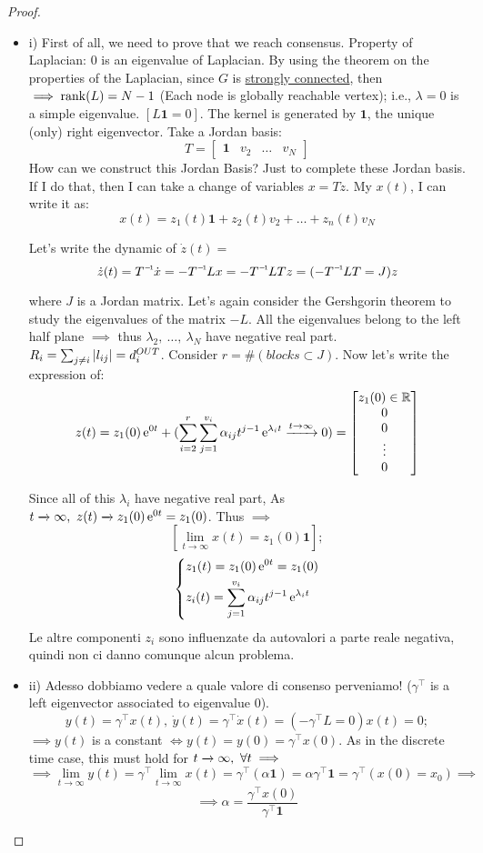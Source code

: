 \begin{proof}
\begin{itemize}
\item{i)}
First of all, we need to prove that we reach consensus. Property of Laplacian: $0$ is an eigenvalue of Laplacian. By using the theorem on the properties of the Laplacian, since $G$ is \underline{strongly connected}, then $\implies \operatorname{rank}(L) = N-1$ (Each node is globally reachable vertex); i.e., $\lambda=0$ is a simple eigenvalue. $[L\mathbf{1}=0]$. The kernel is generated by $\mathbf{1}$, the unique (only) right eigenvector. Take a Jordan basis:
\[
	T = \begin{bmatrix}\mathbf{1}&v_2& \dots & v_N\end{bmatrix}
\]
How can we construct this Jordan Basis? Just to complete these Jordan basis. If I do that, then I can take a change of variables $x=Tz$. My $x(t)$, I can write it as:
\[
	x(t) = z_1(t)\mathbf{1} + z_2(t)v_2 + \dots + z_n(t)v_N
\]

Let's write the dynamic of $\dot{z}(t) = $
\[
	\dot{z}(t) = \inv{T}\dot{x} = -\inv{T}Lx  = -\inv{T}LTz = (-\inv{T}LT=J)z
\]

where $J$ is a Jordan matrix. Let's again consider the Gershgorin theorem to study the eigenvalues of the matrix $-L$. All the eigenvalues belong to the left half plane $\implies$ thus $\lambda_2,\ \dots,\ \lambda_N$ have negative real part. $R_i = \sum_{j\neq i}{\lvert l_{ij}\rvert} = d_i^{OUT}$. Consider $r = \# (blocks \subset J)$. Now let's write the expression of:
\[
	z(t) = z_1(0)\e^{0t} + (\sum_{i=2}^r{\sum_{j=1}^{v_i}{\alpha_{ij}t^{j-1}\e^{\lambda_it}}} \tendsto{t\to\infty} 0) = \begin{bmatrix}z_1(0)\in\R \\0\\0\\ \vdots \\0\end{bmatrix}
\]

Since all of this $\lambda_i$ have negative real part, As $t \tendsto{} \infty,\ z(t) \tendsto{} z_1(0)\e^{0t} = z_1(0)$. Thus $\implies$
\[
	[\lim_{t\to\infty}{x(t)} = z_1(0)\mathbf{1}];
\] 
\[
	\left\{
	\begin{aligned}
	&z_1(t) = z_1(0)\mathop{}\!\mathrm{e}^{0t} = z_1(0) \\
	&z_i(t) = \sum_{j=1}^{v_i}{\alpha_{ij}t^{j-1}\mathop{}\!\mathrm{e}^{\lambda_i t}}
	\end{aligned} 
	\right.
\]
Le altre componenti $z_i$ sono influenzate da autovalori a parte reale negativa, quindi non ci danno comunque alcun problema. \QEDA
\item{ii)} Adesso dobbiamo vedere a quale valore di consenso perveniamo!
($\gamma^\top$ is a left eigenvector associated to eigenvalue 0).
\[	
	y(t) = \gamma^\top x(t),\ \dot{y}(t) = \gamma^\top \dot{x}(t) = (-\gamma^\top L=0)x(t) = 0;
\]
$\implies y(t)$ is a constant $\iff y(t) = y(0) = \gamma^\top x(0)$. As in the discrete time case, this must hold for $t \tendsto{} \infty,\ \forall t \implies$
\[
	\implies \lim_{t\to\infty}{y(t)} = \gamma^\top \lim_{t\to\infty}{x(t)} = \gamma^\top (\alpha\mathbf{1}) = \alpha\gamma^\top\mathbf{1} = \gamma^\top(x(0)=x_0) \implies
\]
\[
	\implies \alpha=\frac{\gamma^\top x(0)}{\gamma^\top\mathbf{1}}
\] \QEDA


\end{itemize}
\end{proof}
